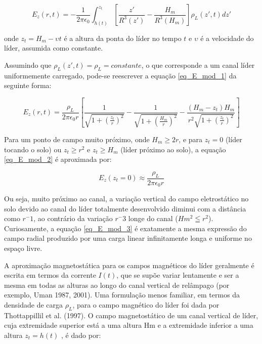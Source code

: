 \documentclass[a4paper, 12pt, onecolumn,singlespacing]{article}
\begin{document}
	\begin{equation}
		E_z(r, t) = -\frac{1}{2 \pi \epsilon_0} \int_{h(t)}^{z_t} \left[\frac{z'}{R^3(z')} - \frac{H_m}{R^3(H_m)}\right] \rho_L(z', t) dz'
		\label{eq_E_mod_1}
	\end{equation}
	
	onde $z_t = H_m - \upsilon t$ é a altura da ponta do líder no tempo $t$ e $\upsilon$ é a velocidade do líder, assumida como constante.
	
	Assumindo que $\rho_L (z', t) = \rho_L = constante$, o que corresponde a um canal líder uniformemente carregado, pode-se reescrever a equação \ref{eq_E_mod_1} da seguinte forma:
	
	\begin{equation}
		E_z(r,t) = \frac{\rho_L}{2 \pi \epsilon_0 r} \left[\frac{1}{\sqrt{1 + \left(\frac{z_t}{r}\right) ^2}} - \frac{1}{\sqrt{1 + \left(\frac{H_m}{r}\right) ^2}} - \frac{\left(H_m - z_t\right) H_m}{r^2\sqrt{1 + \left(\frac{z_t}{r}\right) ^2}}\right]
		\label{eq_E_mod_2}
	\end{equation}
	
	Para um ponto de campo muito próximo, onde $H_m \geq 2r$, e para $z_t = 0$ (líder tocando o solo) ou $z_t \geq r^2$ e $z_t \geq H_m$ (líder próximo ao solo), a equação \ref{eq_E_mod_2} é aproximada por:
	
	\begin{equation}
		E_z(z_t = 0) \approx \frac{\rho_L}{2 \pi \epsilon_0 r}
		\label{eq_E_mod_3}
	\end{equation}
	
	Ou seja, muito próximo ao canal, a variação vertical do campo eletrostático no solo devido ao canal do líder totalmente desenvolvido diminui com a distância como $r^-1$, ao contrário da variação $r^-3$ longe do canal ($Hm^2 \leqq r^2$). Curiosamente, a equação \ref{eq_E_mod_3} é exatamente a mesma expressão do campo radial produzido por uma carga linear infinitamente longa e uniforme no espaço livre.
	
	A aproximação magnetostática para os campos magnéticos do líder geralmente é escrita em termos da corrente $I(t)$, que se supõe variar lentamente e ser a mesma em todas as alturas ao longo do canal vertical de relâmpago (por exemplo, Uman 1987, 2001). Uma formulação menos familiar, em termos da densidade de carga $\rho_L$, para o campo magnético do líder foi dada por Thottappillil et al. (1997). O campo magnetostático de um canal vertical de líder, cuja extremidade superior está a uma altura Hm e a extremidade inferior a uma altura $z_t = h(t)$ , é dado por:
	
\end{document}
